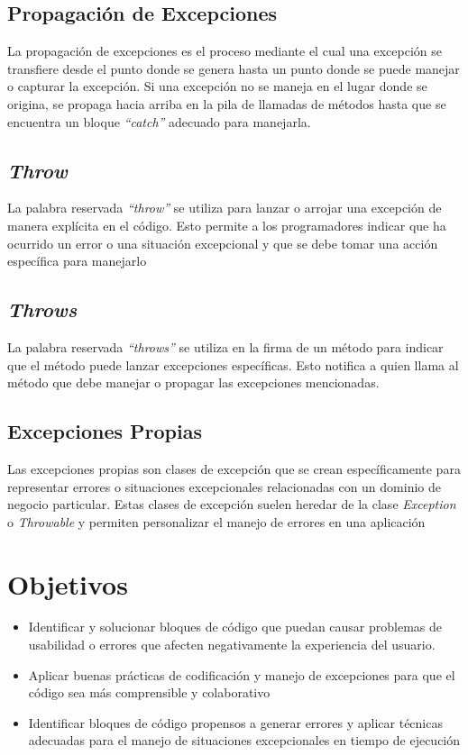 \documentclass[11pt, twocolumn]{article}
\begin{document}
  \subsection*{Propagación de Excepciones}
  La propagación de excepciones es el proceso mediante el cual una excepción se transfiere desde el punto donde se genera hasta un punto donde se puede manejar o capturar la excepción. Si una excepción no se maneja en el lugar donde se origina, se propaga hacia arriba en la pila de llamadas de métodos hasta que se encuentra un bloque \textit{``catch''} adecuado para manejarla.

  \subsection*{\textit{Throw}}
  La palabra reservada \textit{``throw''} se utiliza para lanzar o arrojar una excepción de manera explícita en el código. Esto permite a los programadores indicar que ha ocurrido un error o una situación excepcional y que se debe tomar una acción específica para manejarlo

  \subsection*{\textit{Throws}}
  La palabra reservada \textit{``throws''} se utiliza en la firma de un método para indicar que el método puede lanzar excepciones específicas. Esto notifica a quien llama al método que debe manejar o propagar las excepciones mencionadas. 

  \subsection*{Excepciones Propias}
  Las excepciones propias son clases de excepción que se crean específicamente para representar errores o situaciones excepcionales relacionadas con un dominio de negocio particular. Estas clases de excepción suelen heredar de la clase \textit{Exception} o \textit{Throwable} y permiten personalizar el manejo de errores en una aplicación

  \section*{Objetivos}
  \begin{itemize}
    \item Identificar y solucionar bloques de código que puedan causar problemas de usabilidad o errores que afecten negativamente la experiencia del usuario.
    \item Aplicar buenas prácticas de codificación y manejo de excepciones para que el código sea más comprensible y colaborativo
    \item Identificar bloques de código propensos a generar errores y aplicar técnicas adecuadas para el manejo de situaciones excepcionales en tiempo de ejecución    
  \end{itemize}
\end{document}
